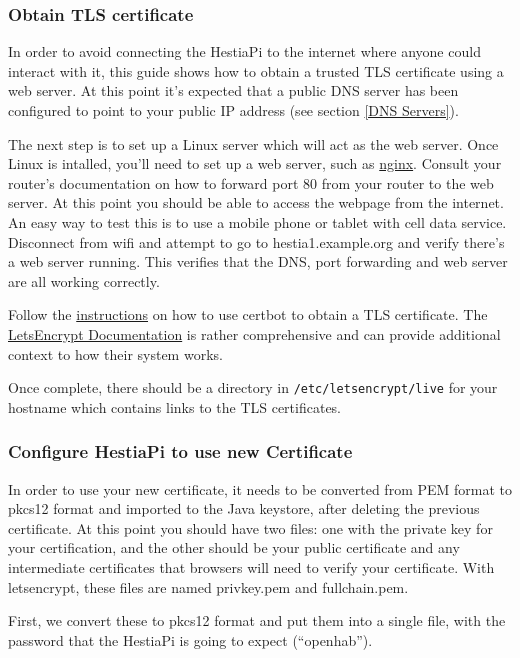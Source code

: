 \subsubsection{Obtain TLS certificate}
In order to avoid connecting the HestiaPi to the internet where anyone could
interact with it, this guide shows how to obtain a trusted TLS certificate
using a web server.  At this point it's expected that a public DNS server has
been configured to point to your public IP address (see section
\ref{DNS Servers}).

The next step is to set up a Linux server which will act as the web server.
Once Linux is intalled, you'll need to set up a web server, such as
\href{https://www.nginx.com/resources/wiki/start/topics/tutorials/install/}
{nginx}.  Consult your router's documentation on how to forward port 80 from
your router to the web server.  At this point you should be able to access the
webpage from the internet.  An easy way to test this is to use a mobile phone
or tablet with cell data service.  Disconnect from wifi and attempt to go to
hestia1.example.org and verify there's a web server running.  This verifies
that the DNS, port forwarding and web server are all working correctly.

Follow the \href{https://certbot.eff.org/instructions}{instructions} on how to
use certbot to obtain a TLS certificate.  The
\href{https://letsencrypt.org/docs/}{LetsEncrypt Documentation} is rather
comprehensive and can provide additional context to how their system works.

Once complete, there should be a directory in \texttt{/etc/letsencrypt/live}
for your hostname which contains links to the TLS certificates.

\subsubsection{Configure HestiaPi to use new Certificate}
In order to use your new certificate, it needs to be converted from PEM format
to pkcs12 format and imported to the Java keystore, after deleting the previous
certificate.  At this point you should have two files: one with the private key
for your certification, and the other should be your public certificate and any
intermediate certificates that browsers will need to verify your certificate.
With letsencrypt, these files are named privkey.pem and fullchain.pem.

First, we convert these to pkcs12 format and put them into a single file, with
the password that the HestiaPi is going to expect (``openhab'').


